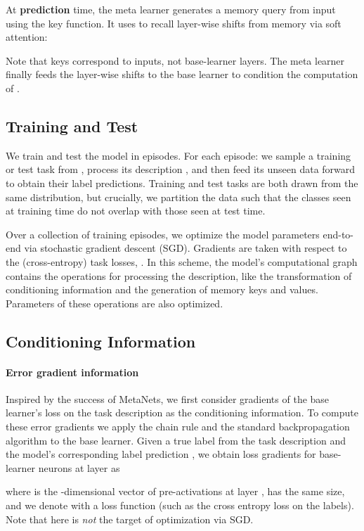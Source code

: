 \documentclass{article}
\begin{document}
At \textbf{prediction} time, the meta learner generates a memory query  from input  using the key function.
It uses  to recall layer-wise shifts  from memory via soft attention:

Note that keys correspond to inputs, not base-learner layers.
The meta learner finally feeds the layer-wise shifts  to the base learner to condition the computation of .

\subsection{Training and Test}
\label{sec:training}
We train and test the model in episodes. For each episode: we sample a training or test task from , process its description , and then feed its unseen data forward to obtain their label predictions.
Training and test tasks are both drawn from the same distribution, but crucially, we partition the data such that the classes seen at training time do not overlap with those seen at test time.

Over a collection of training episodes, we optimize the model parameters end-to-end via stochastic gradient descent (SGD). Gradients are taken with respect to the (cross-entropy) task losses, .
In this scheme, the model's computational graph contains the operations for processing the description, like the transformation of conditioning information and the generation of memory keys and values. Parameters of these operations are also optimized.



\subsection{Conditioning Information}
\label{sec:info}
\paragraph{Error gradient information}
Inspired by the success of MetaNets, we first consider gradients of the base learner's loss on the task description as the conditioning information.
To compute these error gradients we apply the chain rule and the standard backpropagation algorithm to the base learner.
Given a true label  from the task description and the model's corresponding label prediction , we obtain loss gradients for base-learner neurons at layer  as 

where  is the -dimensional vector of pre-activations at layer ,  has the same size, and we denote with  a loss function (such as the cross entropy loss on the labels). Note that  here is \emph{not} the target of optimization via SGD.
\end{document}
